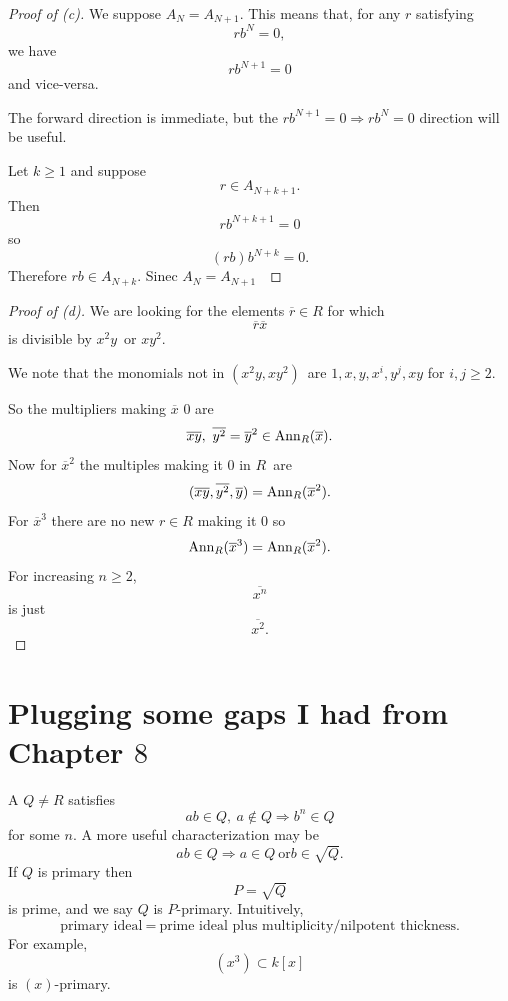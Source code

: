 \documentclass[11pt]{article}
\begin{document}
\begin{proof}[Proof of (c)]
    We suppose $A_N = A_{N+1}$. 
    This means that, 
    for any $r$ satisfying 
    \[
        rb^N = 0, 
    \]
    we have 
    \[
        rb^{N+1} = 0
    \]
    and vice-versa. 

    The forward direction is immediate, but 
    the $rb^{N+1} = 0 \Rightarrow rb^{N} = 0$ direction will 
    be useful.

     

    Let $k \geq 1$ and suppose 
    \[
        r \in A_{N+k+1}. 
    \]
    Then 
    \[
        rb^{N+k+1} = 0 
    \]
    so 
    \[
        (rb)b^{N+k} = 0. 
    \]
    Therefore $rb \in A_{N+k}$. 
    Sinec $A_{N} = A_{N+1}$ 
\end{proof}
\begin{proof}[Proof of (d)]
    We are looking for the elements  
    $\overline r \in R$ for which 
    \[
        \overline r\overline x 
    \]
    is divisible by $x^2y$ or $xy^2$.

    We note that the monomials 
    not in $(x^2y, xy^2)$ are $1,x,y,x^i,y^j, xy$ 
    for $i,j \geq 2$. 

    So the multipliers making $\overline x$  
    $0$ are 
    \[
        \overline{xy}, \ \overline{y^2} = \overline{y}^2 \in 
        \operatorname{Ann}_R(\overline x). 
    \]
    Now for $\overline x^2$ the multiples making it 
    $0$ in $R$ are 
    \[
        (\overline{xy}, \overline{y^2}, \overline y) 
        = \operatorname{Ann}_R(\overline x^2). 
    \]
    For $\overline x^3$ there are no new 
    $r\in R$ making it $0$ so 
    \[
        \operatorname{Ann}_R(\overline x^3) = \operatorname{Ann}_R(\overline x^2). 
    \]
    For increasing $n \geq 2$, 
    \[
        \overline{x^n} 
    \]
    is just 
    \[
        \overline{x^2}.
    \]
\end{proof}

\section{Plugging some gaps I had from Chapter $8$}

A  $Q \neq R$ satisfies 
\[
    ab \in Q, \ a \not \in Q \Rightarrow 
    b^n \in Q 
\]
for some $n$. 
A more useful characterization may be 
\[
    ab \in Q \Rightarrow a \in Q \ \text{or} 
    b \in \sqrt Q. 
\]
If $Q$ is primary then 
\[
    P = \sqrt Q 
\]
is prime, and we say $Q$ is $P$-primary. 
Intuitively, 
\[
    \text{primary ideal} \ = \ 
    \text{prime ideal plus multiplicity/nilpotent thickness.}
\]
For example, 
\[
    (x^3) \subset k[x]
\]
is $(x)$-primary. 
\end{document}
